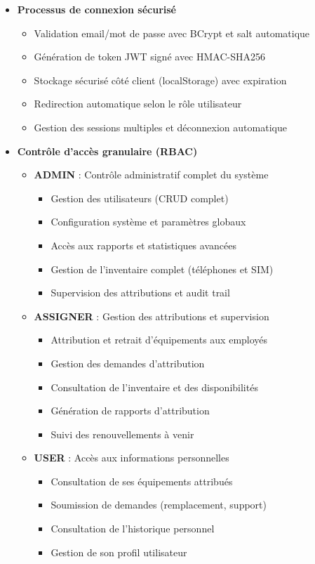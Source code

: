\documentclass[12pt,a4paper]{report}
\begin{document}
\begin{itemize}
\item \textbf{Processus de connexion sécurisé}
  \begin{itemize}

  \item Validation email/mot de passe avec BCrypt et salt automatique
  \item Génération de token JWT signé avec HMAC-SHA256
  \item Stockage sécurisé côté client (localStorage) avec expiration
  \item Redirection automatique selon le rôle utilisateur

  \item Gestion des sessions multiples et déconnexion automatique
  \end{itemize}


\item \textbf{Contrôle d'accès granulaire (RBAC)}
  \begin{itemize}

  \item \textbf{ADMIN} : Contrôle administratif complet du système
    \begin{itemize}
    \item Gestion des utilisateurs (CRUD complet)
    \item Configuration système et paramètres globaux
    \item Accès aux rapports et statistiques avancées
    \item Gestion de l'inventaire complet (téléphones et SIM)
    \item Supervision des attributions et audit trail
    \end{itemize}
  \item \textbf{ASSIGNER} : Gestion des attributions et supervision
    \begin{itemize}
    \item Attribution et retrait d'équipements aux employés
    \item Gestion des demandes d'attribution
    \item Consultation de l'inventaire et des disponibilités
    \item Génération de rapports d'attribution
    \item Suivi des renouvellements à venir
    \end{itemize}
  \item \textbf{USER} : Accès aux informations personnelles
    \begin{itemize}
    \item Consultation de ses équipements attribués
    \item Soumission de demandes (remplacement, support)
    \item Consultation de l'historique personnel
    \item Gestion de son profil utilisateur
    \end{itemize}
  \end{itemize}


\end{itemize}
\end{document}
